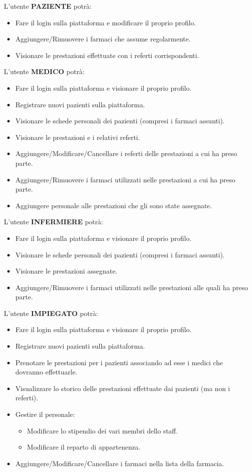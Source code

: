 \documentclass[paper=a4, fontsize=11pt,x11names]{report}
\begin{document}
L'utente \textbf{PAZIENTE} potrà:
\begin{itemize}
\item Fare il login sulla piattaforma e modificare il proprio profilo.
\item Aggiungere/Rimuovere i farmaci che assume regolarmente.
\item Visionare le prestazioni effettuate con i referti corrispondenti.
\end{itemize}

L'utente \textbf{MEDICO} potrà:
\begin{itemize}
\item Fare il login sulla piattaforma e visionare il proprio profilo.
\item Registrare nuovi pazienti sulla piattaforma.
\item Visionare le schede personali dei pazienti (compresi i farmaci assunti).
\item Visionare le prestazioni e i relativi referti.
\item Aggiungere/Modificare/Cancellare i referti delle prestazioni a cui ha preso parte.
\item Aggiungere/Rimuovere i farmaci utilizzati nelle prestazioni a cui ha preso parte.
\item Aggiungere personale alle prestazioni che gli sono state assegnate.
\end{itemize}

L'utente \textbf{INFERMIERE} potrà:
\begin{itemize}
\item Fare il login sulla piattaforma e visionare il proprio profilo.
\item Visionare le schede personali dei pazienti (compresi i farmaci assunti).
\item Visionare le prestazioni assegnate.
\item Aggiungere/Rimuovere i farmaci utilizzati nelle prestazioni alle quali ha preso parte.
\end{itemize}

L'utente \textbf{IMPIEGATO} potrà:
\begin{itemize}
\item Fare il login sulla piattaforma e visionare il proprio profilo.
\item Registrare nuovi pazienti sulla piattaforma.
\item Prenotare le prestazioni per i pazienti associando ad esse i medici che dovranno effettuarle.
\item Visualizzare lo storico delle prestazioni effettuate dai pazienti (ma non i referti). 
\item Gestire il personale:
	\begin{itemize}
		\item Modificare lo stipendio dei vari membri dello staff.
		\item Modificare il reparto di appartenenza.
	\end{itemize}
\item Aggiungere/Modificare/Cancellare i farmaci nella lista della farmacia.
\end{itemize}
\end{document}

